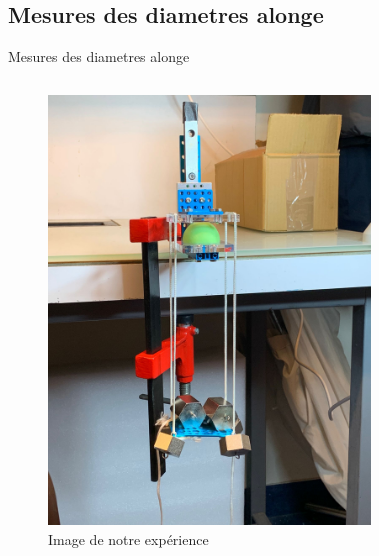 \subsection{Mesures des diametres alonge}
\begin{frame}{Mesures des diametres alonge}
    \begin{columns}
        \begin{figure}
            \centering
            \includegraphics[height=0.65\textheight]{Figures/IMG-20221205-WA0025.jpg}
            \caption{Image de notre expérience}
            \label{fig:my_label}
        \end{figure}    
        \begin{figure}
            \centering

\end{figure}
\end{columns}
\end{frame}
